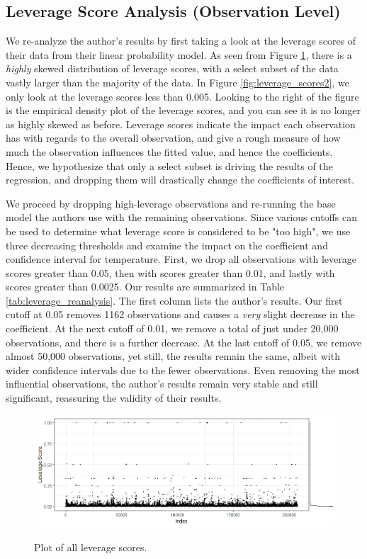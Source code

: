 \documentclass{article}
\begin{document}
	\subsection{Leverage Score Analysis (Observation Level)}
	
	We re-analyze the author's results by first taking a look at the leverage scores of their data from their linear probability model. As seen from Figure \ref{fig:leverage_scores1}, there is a \textit{highly} skewed distribution of leverage scores, with a select subset of the data vastly larger than the majority of the data. In Figure \ref{fig:leverage_scores2}, we only look at the leverage scores less than 0.005. Looking to the right of the figure is the empirical density plot of the leverage scores, and you can see it is no longer as highly skewed as before. Leverage scores indicate the impact each observation has with regards to the overall observation, and give a rough measure of how much the observation influences the fitted value, and hence the coefficients. Hence, we hypothesize that only a select subset is driving the results of the regression, and dropping them will drastically change the coefficients of interest. 
	
	We proceed by dropping high-leverage observations and re-running the base model the authors use with the remaining observations. Since various cutoffs can be used to determine what leverage score is considered to be "too high", we use three decreasing thresholds and examine the impact on the coefficient and confidence interval for temperature. First, we drop all observations with leverage scores greater than 0.05, then with scores greater than 0.01, and lastly with scores greater than 0.0025. Our results are summarized in Table \ref{tab:leverage_reanalysis}. The first column lists the author's results. Our first cutoff at 0.05 removes 1162 observations and causes a \textit{very} slight decrease in the coefficient. At the next cutoff of 0.01, we remove a total of just under 20,000 observations, and there is a further decrease. At the last cutoff of 0.05, we remove almost 50,000 observations, yet still, the results remain the same, albeit with wider confidence intervals due to the fewer observations. Even removing the most influential observations, the author's results remain very stable and still significant, reassuring the validity of their results. 
	
	\begin{figure}[h!]
		\centering
		\caption{Plot of all leverage scores.}
		\includegraphics[width=\textwidth]{leverage_scores_1.jpg}
		\label{fig:leverage_scores1}
	\end{figure}
	
\end{document}
